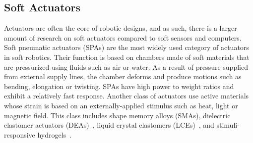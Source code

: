 \subsection{Soft Actuators}
Actuators are often the core of robotic designs, and as such, there is a larger amount of research on soft actuators compared to soft sensors and computers. Soft pneumatic actuators (SPAs) \cite{Gorissen2017, Branyan2018} are the most widely used category of actuators in soft robotics. Their function is based on chambers made of soft materials that are pressurized using fluids such as air or water. As a result  of pressure supplied from external supply lines, the chamber deforms and produce motions such as bending, elongation or twisting. SPAs have high power to weight ratios and exhibit a relatively fast response.  Another class of actuators use active materials whose strain is based on an externally-applied stimulus such as heat, light or magnetic field. This class includes shape memory alloys (SMAs)\cite{Cianchetti2014}, dielectric elastomer actuators (DEAs)~\cite{Carpi2008,Gu2017}, liquid crystal elastomers (LCEs)~\cite{Kularatne2017,Yu2015a}, and stimuli-responsive hydrogels~\cite{Calvert2009,Liu2020,Ionov2014,Banerjee2018}. 
 

